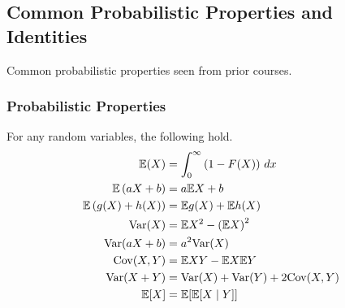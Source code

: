 \subsection*{Common Probabilistic Properties and Identities}

Common probabilistic properties seen from prior courses.

\subsubsection*{Probabilistic Properties}
For any random variables, the following hold.
\begin{align}
    \Em (X)                                  & = \int_{0}^{\infty} \left( 1 - F(X) \right) \, dx                                                                                                              \\
    \Em \left( aX + b \right)                & = a \Em X + b                                                                                                                                                  \\
    \Em \left( g(X) + h(X) \right)           & = \Em g(X) + \Em h (X)                                                                                                                                         \\
    \Var (X)                                 & = \Em X^2 - \left( \Em X \right)^2                                                                                                                             \\
    \Var (aX + b)                            & = a^2 \Var (X)                                                                                                                                                 \\
    \Cov (X,Y)                               & = \Em XY - \Em X \Em Y                                                                                                                                         \\
    \Var (X + Y)                             & = \Var (X) + \Var (Y) + 2 \Cov (X,Y)                                                                                                                           \\
    \Em [X]                                  & = \Em [ \Em [X \mid Y] ]                                                                                                                                       \\

\end{align}
